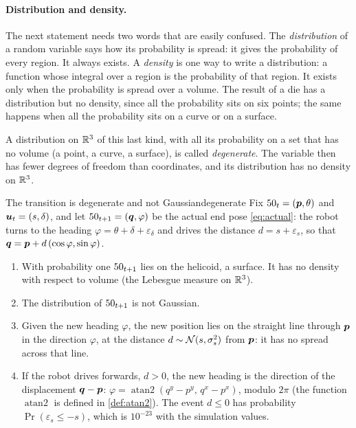 \paragraph{Distribution and density.} The next statement needs two words
that are easily confused. The \emph{distribution} of a random variable
says how its probability is spread: it gives the probability of every
region. It always exists. A \emph{density} is one way to write a
distribution: a function whose integral over a region is the probability
of that region. It exists only when the probability is spread over a
volume. The result of a die has a distribution but no density, since all
the probability sits on six points; the same happens when all the
probability sits on a curve or on a surface.

A distribution on $\mathbb{R}^3$ of this last kind, with all its probability on a
set that has no volume (a point, a curve, a surface), is called
\emph{degenerate}. The variable then has fewer degrees of freedom than
coordinates, and its distribution has no density on $\mathbb{R}^3$.

\begin{proposition}{The transition is degenerate and not Gaussian}{degenerate}
Fix $50_t=(\bm{p},\theta)$ and $\bm{u}_t=(s,\delta)$, and let
$50_{t+1}=(\bm{q},\varphi)$ be the actual end pose \eqref{eq:actual}: the
robot turns to the heading $\varphi=\theta+\delta+\varepsilon_\delta$ and
drives the distance $d=s+\varepsilon_s$, so that
$\bm{q}=\bm{p}+d\,(\cos\varphi,\sin\varphi)$.
\begin{enumerate}[label=(\roman*),nosep]
\item With probability one $50_{t+1}$ lies on the helicoid, a surface. It
  has no density with respect to volume (the Lebesgue measure on $\mathbb{R}^3$).
\item The distribution of $50_{t+1}$ is not Gaussian.
\item Given the new heading $\varphi$, the new position lies on the
  straight line through $\bm{p}$ in the direction $\varphi$, at the distance
  $d\sim\mathcal{N}(s,\sigma_s^2)$ from $\bm{p}$: it has no spread across that
  line.
\item If the robot drives forwards, $d>0$, the new heading is the
  direction of the displacement $\bm{q}-\bm{p}$:
  $\varphi=\operatorname{atan2}(q^y-p^y,\,q^x-p^x)$, modulo $2\pi$ (the
  function $\operatorname{atan2}$ is defined in \cref{def:atan2}). The
  event $d\le0$ has probability $\Pr(\varepsilon_s\le-s)$, which is
  $10^{-23}$ with the simulation values.
\end{enumerate}
\end{proposition}


